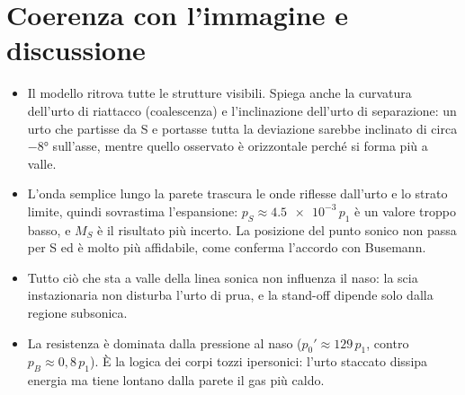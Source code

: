 \documentclass[11pt,a4paper]{article}
\begin{document}
\section{Coerenza con l'immagine e discussione}
\begin{itemize}
\item Il modello ritrova tutte le strutture visibili. Spiega anche la curvatura dell'urto di riattacco
  (coalescenza) e l'inclinazione dell'urto di separazione: un urto che partisse da S e portasse tutta la
  deviazione sarebbe inclinato di circa $-\ang{8}$ sull'asse, mentre quello osservato è orizzontale perché si forma più a valle.
\item L'onda semplice lungo la parete trascura le onde riflesse dall'urto e lo strato limite, quindi
  sovrastima l'espansione: $p_S\approx\num{4.5e-3}\,p_1$ è un valore troppo basso, e $M_S$ è il risultato più incerto. La
  posizione del punto sonico non passa per S ed è molto più affidabile, come conferma l'accordo con Busemann.
\item Tutto ciò che sta a valle della linea sonica non influenza il naso: la scia instazionaria non disturba
  l'urto di prua, e la stand-off dipende solo dalla regione subsonica.
\item La resistenza è dominata dalla pressione al naso ($p_0'\approx129\,p_1$, contro $p_B\approx0{,}8\,p_1$). È la logica
  dei corpi tozzi ipersonici: l'urto staccato dissipa energia ma tiene lontano dalla parete il gas più caldo.
\end{itemize}
\end{document}
